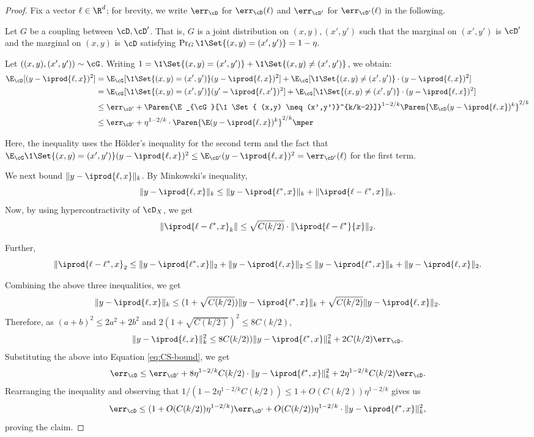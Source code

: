 \begin{proof}
Fix a vector $\ell \in \R^d$; for brevity, we write $\err_\cD$ for $\err_\cD(\ell)$ and $\err_{\cD'}$ for $\err_{\cD'}(\ell)$ in the following. 

Let $G$ be a coupling between $\cD,\cD'$. That is, $G$ is a joint distribution on $(x,y), (x',y')$ such that the marginal on $(x',y')$ is $\cD'$ and the marginal on $(x,y)$ is $\cD$ satisfying $\Pr_G \1 \Set{ (x,y) = (x',y')} = 1-\eta.$ 

Let $((x,y), (x',y')) \sim \cG$. Writing $1 = \1 \Set{ (x,y) = (x',y')} + \1 \Set{ (x,y) \neq (x',y')}$, we obtain:
\begin{align}
\E_{\cD}[(y-\iprod{\ell,x})^2] &= \E_{\cG}[ \1 \Set{ (x,y) = (x',y')} (y-\iprod{\ell,x})^2] + \E_{\cG}[ \1 \Set{ (x,y) \neq (x',y')} \cdot (y-\iprod{\ell,x})^2]\notag\\
&= \E_{\cG} [\1 \Set{ (x,y) = (x',y')} (y' -\iprod{\ell,x'})^2 ]+  \E_{\cG}[ \1 \Set{ (x,y) \neq (x',y')} \cdot (y-\iprod{\ell,x})^2]\notag\\
&\leq \err_{\cD'} + \Paren{\E_{\cG}[\1 \Set{ (x,y) \neq (x',y')}^{k/k-2}]}^{1-2/k} \Paren{\E_{\cD} (y-\iprod{\ell,x})^k}^{2/k}\notag\\
&\leq \err_{\cD'}+ \eta^{1-2/k} \cdot \Paren{\E (y-\iprod{\ell,x})^k}^{2/k} \label{eq:CS-bound}\mper
\end{align}

Here, the inequality uses the H\"older's inequality for the second term and the fact that $\E_\cG \1 \Set{ (x,y) = (x',y')} (y-\iprod{\ell,x})^2 \leq \E_{\cD'} (y-\iprod{\ell,x})^2 = \err_{\cD'}(\ell)$ for the first term. 

We next bound $\|y - \iprod{\ell,x}\|_k$. By Minkowski's inequality, 
$$\|y - \iprod{\ell,x}\|_k \leq \|y - \iprod{\ell^*,x}\|_k + \|\iprod{\ell - \ell^*,x}\|_k.$$
Now, by using hypercontractivity of $\cD_X$, we get
\begin{equation}\label{eq:gen1}
\|\iprod{\ell - \ell^*,x}_k \| \leq \sqrt{C(k/2)} \cdot \|\iprod{\ell - \ell^*}{x}\|_2.
\end{equation}

Further, 
$$\|\iprod{\ell - \ell^*,x}_2 \leq \|y - \iprod{\ell^*,x}\|_2 + \|y - \iprod{\ell,x}\|_2 \leq \|y - \iprod{\ell^*,x}\|_k + \|y - \iprod{\ell,x}\|_2.$$

Combining the above three inequalities, we get
$$\|y - \iprod{\ell,x}\|_k \leq (1 + \sqrt{C(k/2)}) \|y - \iprod{\ell^*,x}\|_k + \sqrt{C(k/2)} \|y - \iprod{\ell,x}\|_2.$$
Therefore, as $(a+b)^2 \leq 2 a^2 + 2 b^2$ and $2 (1 + \sqrt{C(k/2)})^2 \leq 8 C(k/2)$, 
$$\|y - \iprod{\ell,x}\|_k^2  \leq 8 C(k/2)) \|y - \iprod{\ell^*,x}\|_k^2 + 2 C(k/2) \err_\cD.$$
Substituting the above into Equation \ref{eq:CS-bound}, we get
$$\err_{\cD} \leq \err_{\cD'} + 8 \eta^{1-2/k} C(k/2) \cdot  \|y - \iprod{\ell^*,x}\|_k^2 + 2 \eta^{1-2/k} C(k/2) \err_{\cD}.$$
Rearranging the inequality and observing that $1/(1- 2 \eta^{1-2/k} C(k/2)) \leq 1 + O(C(k/2)) \eta^{1-2/k}$ gives us
$$\err_{\cD} \leq (1 + O(C(k/2)) \eta^{1-2/k}) \err_{\cD'} +O(C(k/2)) \eta^{1-2/k} \cdot  \|y - \iprod{\ell^*,x}\|_k^2,$$
proving the claim.
\ignore{

}
\end{proof}
